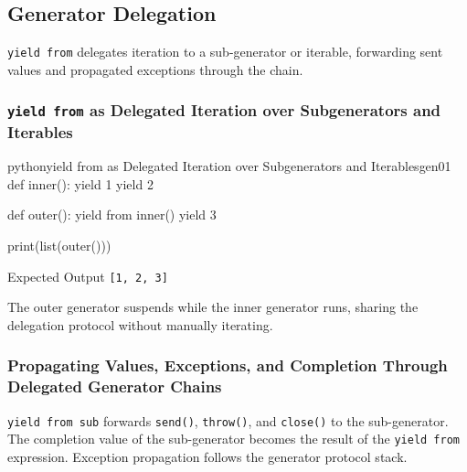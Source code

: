 \subsection{Generator Delegation}

\texttt{yield from} delegates iteration to a sub-generator or iterable, forwarding sent values and propagated exceptions through the chain.

\subsubsection{\texttt{yield from} as Delegated Iteration over Subgenerators and Iterables}

\begin{codebox}[]{python}{yield from as Delegated Iteration over Subgenerators and Iterables}{gen01}
def inner():
    yield 1
    yield 2

def outer():
    yield from inner()
    yield 3

print(list(outer()))
\end{codebox}


\begin{iobox}{Expected Output}
\texttt{[1, 2, 3]} \\
\end{iobox}




The outer generator suspends while the inner generator runs, sharing the delegation protocol without manually iterating.

\subsubsection{Propagating Values, Exceptions, and Completion Through Delegated Generator Chains}

\texttt{yield from sub} forwards \texttt{send()}, \texttt{throw()}, and \texttt{close()} to the sub-generator. The completion value of the sub-generator becomes the result of the \texttt{yield from} expression. Exception propagation follows the generator protocol stack.
